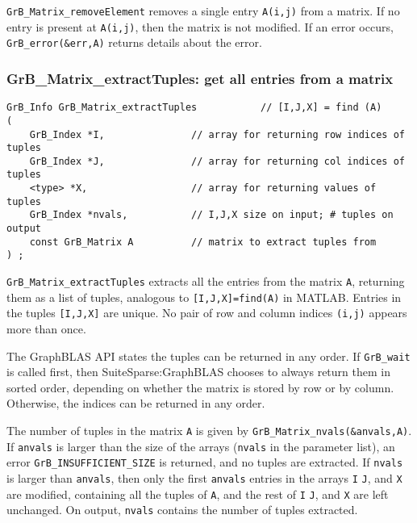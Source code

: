 \documentclass[12pt]{article}
\begin{document}
{\verb'GrB_Matrix_removeElement' removes a single entry \verb'A(i,j)' from a matrix.
If no entry is present at \verb'A(i,j)', then the matrix is not modified.
If an error occurs, \verb'GrB_error(&err,A)' returns details about the error.

\subsubsection{{\sf GrB\_Matrix\_extractTuples:} get all entries from a matrix}
\label{matrix_extractTuples}

\begin{mdframed}[userdefinedwidth=6in]
{\footnotesize
\begin{verbatim}
GrB_Info GrB_Matrix_extractTuples           // [I,J,X] = find (A)
(
    GrB_Index *I,               // array for returning row indices of tuples
    GrB_Index *J,               // array for returning col indices of tuples
    <type> *X,                  // array for returning values of tuples
    GrB_Index *nvals,           // I,J,X size on input; # tuples on output
    const GrB_Matrix A          // matrix to extract tuples from
) ;
\end{verbatim} } \end{mdframed}

\verb'GrB_Matrix_extractTuples' extracts all the entries from the matrix
\verb'A', returning them as a list of tuples, analogous to
\verb'[I,J,X]=find(A)' in MATLAB.  Entries in the tuples \verb'[I,J,X]' are
unique.  No pair of row and column indices \verb'(i,j)' appears more than once.

The GraphBLAS API states the tuples can be returned in any order.  If
\verb'GrB_wait' is called first, then SuiteSparse:GraphBLAS chooses to
always return them in sorted order, depending on whether the matrix is stored
by row or by column.  Otherwise, the indices can be returned in any order.

The number of tuples in the matrix \verb'A' is given by
\verb'GrB_Matrix_nvals(&anvals,A)'.  If \verb'anvals' is larger than the size
of the arrays (\verb'nvals' in the parameter list), an error
\verb'GrB_INSUFFICIENT_SIZE' is returned, and no tuples are extracted.  If
\verb'nvals' is larger than \verb'anvals', then only the first \verb'anvals'
entries in the arrays \verb'I' \verb'J', and \verb'X' are modified, containing
all the tuples of \verb'A', and the rest of \verb'I' \verb'J', and \verb'X' are
left unchanged.  On output, \verb'nvals' contains the number of tuples
extracted.

}
\end{document}
